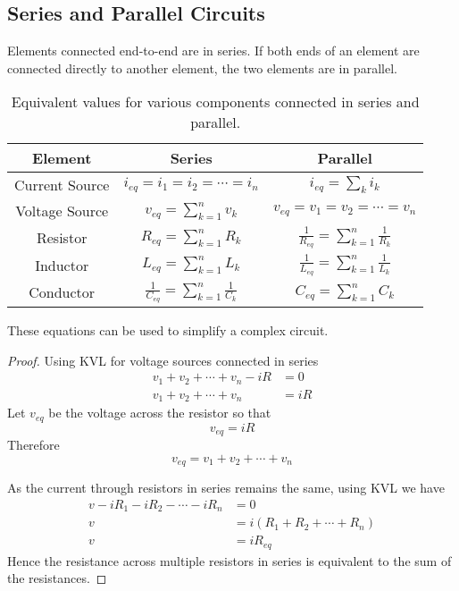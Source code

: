 \documentclass{article}
\begin{document}
\subsection{Series and Parallel Circuits}
\begin{definition}
    Elements connected end-to-end are in series. If both ends of an element are connected directly to another element, the two elements are in parallel.
\end{definition}
\begin{table}[H]
    \centering
    \begin{tabular}{c | c c}
        \toprule
        \textbf{Element} &  \textbf{Series} & \textbf{Parallel} \\
        \midrule
        Current Source & $\displaystyle i_{eq} = i_1 = i_2 = \cdots = i_n$             & $i_{eq} = \displaystyle \sum_k i_k$ \\
        Voltage Source & $\displaystyle v_{eq} = \sum_{k=1}^n v_k$                     & $\displaystyle v_{eq} = v_1 = v_2 = \cdots = v_n$ \\
        Resistor       & $\displaystyle R_{eq} = \sum_{k=1}^n R_k$                     & $\displaystyle \frac{1}{R_{eq}} = \sum_{k=1}^n \frac{1}{R_k}$ \\
        Inductor       & $\displaystyle L_{eq} = \sum_{k=1}^n L_k$                     & $\displaystyle \frac{1}{L_{eq}} = \sum_{k=1}^n \frac{1}{L_k}$ \\
        Conductor      & $\displaystyle \frac{1}{C_{eq}} = \sum_{k=1}^n \frac{1}{C_k}$ & $\displaystyle C_{eq} = \sum_{k=1}^n C_k$ \\
        \bottomrule
    \end{tabular}
    \caption{Equivalent values for various components connected in series and parallel.}
\end{table}
These equations can be used to simplify a complex circuit.
\begin{proof}
    Using KVL for voltage sources connected in series
    \begin{align*}
        v_1 + v_2 + \cdots + v_n - iR &= 0 \\
        v_1 + v_2 + \cdots + v_n &= iR
    \end{align*}
    Let $v_{eq}$ be the voltage across the resistor so that
    \begin{equation*}
        v_{eq} = iR
    \end{equation*}
    Therefore
    \begin{equation*}
        v_{eq} = v_1 + v_2 + \cdots + v_n
    \end{equation*}
    
    As the current through resistors in series remains the same, using KVL we have
    \begin{align*}
        v - iR_1 - iR_2 - \cdots - iR_n &= 0 \\
        v &= i\left(R_1 + R_2 + \cdots + R_n\right) \\
        v &= iR_{eq}
    \end{align*}
    Hence the resistance across multiple resistors in series is equivalent to the sum of the resistances.
\end{proof}
\end{document}
